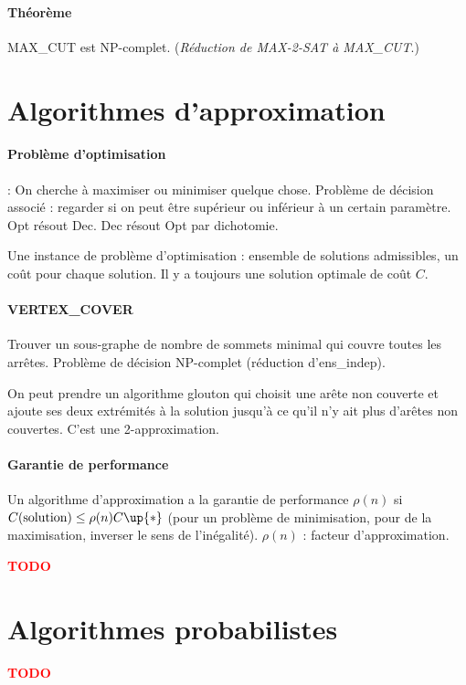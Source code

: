 \documentclass[french]{article}
\newcommand{\TODO}{\textcolor{red}{\textbf{TODO}}}
\begin{document}
\paragraph{Théorème} MAX\_CUT est NP-complet. (\emph{Réduction de MAX-2-SAT à MAX\_CUT}.)

\section{Algorithmes d'approximation}
\paragraph{Problème d'optimisation} : On cherche à maximiser ou minimiser quelque chose. Problème de décision associé : regarder si on peut être supérieur ou inférieur à un certain paramètre. Opt résout Dec. Dec résout Opt par dichotomie.

Une instance de problème d'optimisation : ensemble de solutions admissibles, un coût pour chaque solution. Il y a toujours une solution optimale de coût $C$\up{*}.

\paragraph{VERTEX\_COVER} Trouver un sous-graphe de nombre de sommets minimal qui couvre toutes les arrêtes. Problème de décision NP-complet (réduction d'ens\_indep).

On peut prendre un algorithme glouton qui choisit une arête non couverte et ajoute ses deux extrémités à la solution jusqu'à ce qu'il n'y ait plus d'arêtes non couvertes. C'est une 2-approximation.

\paragraph{Garantie de performance} Un algorithme d'approximation a la garantie de performance $\rho(n)$ si $C(\text{solution})\leq\rho(n) C\up{*}$ (pour un problème de minimisation, pour de la maximisation, inverser le sens de l'inégalité). $\rho(n)$ : facteur d'approximation.





\TODO

\section{Algorithmes probabilistes}

\TODO
\end{document}
